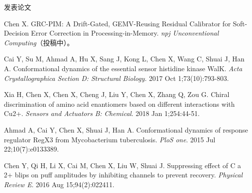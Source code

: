 \documentclass{resume} %
\begin{document}
\begin{rSection}{发表论文}
\begin{rSubsection}{}{}
{}{}
  \item {Chen X. GRC-PIM: A Drift-Gated, GEMV-Reusing Residual Calibrator for Soft-Decision Error Correction in Processing-in-Memory. {\textit{npj Unconventional Computing}}（投稿中）。}\\
  \item {Cai Y, Su M, Ahmad A, Hu X, Sang J, Kong L, Chen X, Wang C, Shuai J, Han A. Conformational dynamics of the essential sensor histidine kinase WalK. {\textit{Acta Crystallographica Section D: Structural Biology.}} 2017 Oct 1;73(10):793-803.}\\
  \item {Xia H, Chen X, Chen X, Cheng J, Liu Y, Chen X, Zhang Q, Zou G. Chiral discrimination of amino acid enantiomers based on different interactions with Cu2+. {\textit{Sensors and Actuators B: Chemical}}. 2018 Jan 1;254:44-51.}\\
  \item {Ahmad A, Cai Y, Chen X, Shuai J, Han A. Conformational dynamics of response regulator RegX3 from Mycobacterium tuberculosis. {\textit{PloS one}}. 2015 Jul 22;10(7):e0133389.}\\
  \item {Chen Y, Qi H, Li X, Cai M, Chen X, Liu W, Shuai J. Suppressing effect of C a 2+ blips on puff amplitudes by inhibiting channels to prevent recovery. {\textit{Physical Review E}}. 2016 Aug 15;94(2):022411.}\\
\end{rSubsection}
\end{rSection}



\end{document}
